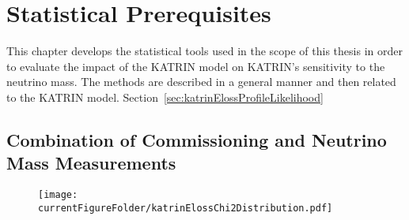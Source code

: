 \def\currentRootFolder{chapter/sensitivityStudyWithPreliminaryKatrinElossModel/statisticalPrerequisites}
\def\currentFigureFolder{\currentRootFolder/fig}



\section{Statistical Prerequisites}
\label{sec:katrinElossStatistics}
This chapter develops the statistical tools used in the scope of this thesis in order to evaluate the impact of the KATRIN model on KATRIN's sensitivity to the neutrino mass. The methods are described in a general manner and then related to the KATRIN model. Section~\ref{sec:katrinElossProfileLikelihood} 

\subsection{Combination of Commissioning and Neutrino Mass Measurements}
\begin{figure}[th]
	\centering
	\texttt{[image: \\currentFigureFolder/katrinElossChi2Distribution.pdf]}
	\xcaption{}{}{}
	\label{fig:katrinElossStatisticsChi2}
\end{figure}



